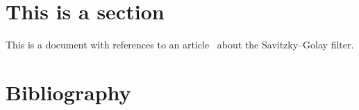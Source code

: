 \documentclass[a4paper, 12pt]{article}
\begin{document}
  \section{This is a section}
  This is a document with references to an article~\cite{atcl:savgol} about the Savitzky--Golay filter.

  \appendix
  \section{Bibliography}
  \printbibliography
\end{document}
